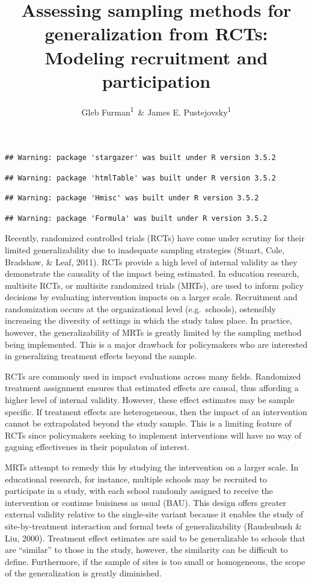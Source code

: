 \documentclass[man,floatsintext]{apa6}
\title{Assessing sampling methods for generalization from RCTs: Modeling recruitment and participation}
\author{Gleb Furman\textsuperscript{1}~\& James E. Pustejovsky\textsuperscript{1}}
\date{}
\affiliation{
\vspace{0.5cm}
\textsuperscript{1} University of Texas at Austin}
\begin{document}
\maketitle

\begin{verbatim}
## Warning: package 'stargazer' was built under R version 3.5.2
\end{verbatim}

\begin{verbatim}
## Warning: package 'htmlTable' was built under R version 3.5.2
\end{verbatim}

\begin{verbatim}
## Warning: package 'Hmisc' was built under R version 3.5.2
\end{verbatim}

\begin{verbatim}
## Warning: package 'Formula' was built under R version 3.5.2
\end{verbatim}

Recently, randomized controlled trials (RCTs) have come under scrutiny for their limited generalizability due to inadequate sampling strategies (Stuart, Cole, Bradshaw, \& Leaf, 2011). RCTs provide a high level of internal validity as they demonstrate the causality of the impact being estimated. In education research, multisite RCTs, or multisite randomized trials (MRTs), are used to inform policy decisions by evaluating intervention impacts on a larger scale. Recruitment and randomization occurs at the organizational level (e.g.~schools), ostensibly increasing the diversity of settings in which the study takes place. In practice, however, the generalizability of MRTs is greatly limited by the sampling method being implemented. This is a major drawback for policymakers who are interested in generalizing treatment effects beyond the sample.

RCTs are commonly used in impact evaluations across many fields. Randomized treatment assignment ensures that estimated effects are causal, thus affording a higher level of internal validity. However, these effect estimates may be sample specific. If treatment effects are heterogeneous, then the impact of an intervention cannot be extrapolated beyond the study sample. This is a limiting feature of RCTs since policymakers seeking to implement interventions will have no way of gaguing effectivenes in their populaton of interest.

MRTs attempt to remedy this by studying the intervention on a larger scale. In educational research, for instance, multiple schools may be recruited to participate in a study, with each school randomly assigned to receive the intervention or continue buisiness as usual (BAU). This design offers greater external validity relative to the single-site variant because it enables the study of site-by-treatment interaction and formal tests of generalizability (Raudenbush \& Liu, 2000). Treatment effect estimates are said to be generalizable to schools that are \enquote{similar} to those in the study, however, the similarity can be difficult to define. Furthermore, if the sample of sites is too small or homogeneous, the scope of the generalization is greatly diminished.
\end{document}
